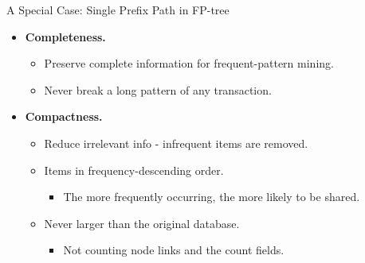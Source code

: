 \begin{frame}{A Special Case: Single Prefix Path in FP-tree}
	\centering
	\begin{itemize}
		\item \textbf{Completeness.}
		      \begin{itemize}
			      \item Preserve complete information for frequent-pattern mining.
			      \item Never break a long pattern of any transaction.
		      \end{itemize}
		\item \textbf{Compactness.}
		      \begin{itemize}
			      \item Reduce irrelevant info - infrequent items are removed.
			      \item Items in frequency-descending order.
			            \begin{itemize}
				            \item The more frequently occurring, the more likely to be
				                  shared.
			            \end{itemize}
			      \item Never larger than the original database.
			            \begin{itemize}
				            \item Not counting node links and the count fields.
			            \end{itemize}
		      \end{itemize}
	\end{itemize}
\end{frame}

